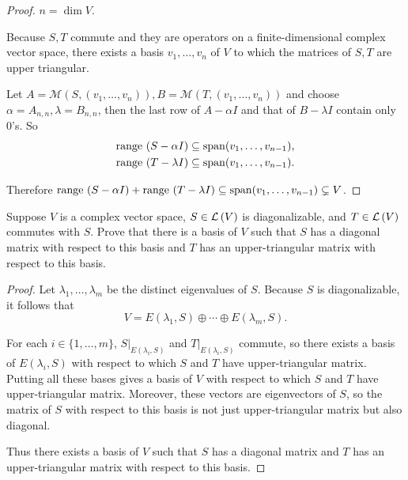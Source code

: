 \begin{proof}
    $n = \dim V$.

    Because $S, T$ commute and they are operators on a finite-dimensional complex vector space, there exists a basis $v_{1}, \ldots, v_{n}$ of $V$ to which the matrices of $S, T$ are upper triangular.

    Let $A = \mathcal{M}(S, (v_{1}, \ldots, v_{n})), B = \mathcal{M}(T, (v_{1}, \ldots, v_{n}))$ and choose $\alpha = A_{n,n}, \lambda = B_{n,n}$, then the last row of $A - \alpha I$ and that of $B - \lambda I$ contain only $0$'s. So
    \[
        \begin{split}
            \operatorname{range}\,{(S - \alpha I)}\subseteq \operatorname{span}(v_{1}, \ldots, v_{n-1}), \\
            \operatorname{range}\,{(T - \lambda I)}\subseteq \operatorname{span}(v_{1}, \ldots, v_{n-1}).
        \end{split}
    \]

    Therefore $\operatorname{range}\,{(S - \alpha I)} + \operatorname{range}\,{(T - \lambda I)} \subseteq \operatorname{span}(v_{1}, \ldots, v_{n-1}) \subsetneq V$.
\end{proof}
\newpage

\begin{exercise}
    Suppose $V$ is a complex vector space, $S \in \mathcal{L}\left({V}\right)$ is diagonalizable, and $T\in\mathcal{L}\left({V}\right)$ commutes with $S$. Prove that there is a basis of $V$ such that $S$ has a diagonal matrix with respect to this basis and $T$ has an upper-triangular matrix with respect to this basis.
\end{exercise}

\begin{proof}
    Let $\lambda_{1}, \ldots, \lambda_{m}$ be the distinct eigenvalues of $S$. Because $S$ is diagonalizable, it follows that
    \[
        V = E(\lambda_{1}, S) \oplus \cdots \oplus E(\lambda_{m}, S).
    \]

    For each $i\in\{1, \ldots, m\}$, $S\vert_{E(\lambda_{i}, S)}$ and $T\vert_{E(\lambda_{i}, S)}$ commute, so there exists a basis of $E(\lambda_{i}, S)$ with respect to which $S$ and $T$ have upper-triangular matrix. Putting all these bases gives a basis of $V$ with respect to which $S$ and $T$ have upper-triangular matrix. Moreover, these vectors are eigenvectors of $S$, so the matrix of $S$ with respect to this basis is not just upper-triangular matrix but also diagonal.

    Thus there exists a basis of $V$ such that $S$ has a diagonal matrix and $T$ has an upper-triangular matrix with respect to this basis.
\end{proof}
\newpage

